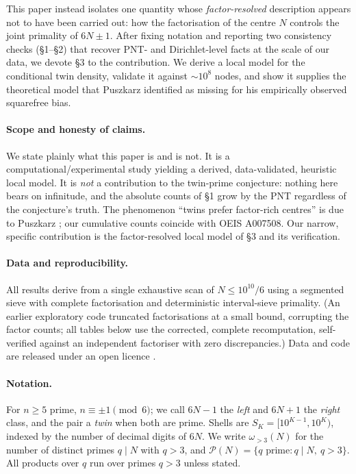 \documentclass[11pt]{article}
\theoremstyle{definition}
\theoremstyle{remark}
\begin{document}
This paper instead isolates one quantity whose \emph{factor-resolved} description
appears not to have been carried out: how the factorisation of the centre $N$
controls the joint primality of $6N\pm1$. After fixing notation and reporting two
consistency checks (\S1--\S2) that recover PNT- and Dirichlet-level facts at the
scale of our data, we devote \S3 to the contribution. We derive a local model for
the conditional twin density, validate it against $\sim\!10^8$ nodes, and show it
supplies the theoretical model that Puszkarz \cite{Puszkarz} identified as missing
for his empirically observed squarefree bias.

\paragraph{Scope and honesty of claims.}
We state plainly what this paper is and is not. It is a computational/experimental
study yielding a derived, data-validated, heuristic local model. It is
\emph{not} a contribution to the twin-prime conjecture: nothing here bears on
infinitude, and the absolute counts of \S1 grow by the PNT regardless of the
conjecture's truth. The phenomenon ``twins prefer factor-rich centres'' is due to
Puszkarz \cite{Puszkarz}; our cumulative counts coincide with OEIS A007508. Our
narrow, specific contribution is the factor-resolved local model of \S3 and its
verification.

\paragraph{Data and reproducibility.}
All results derive from a single exhaustive scan of $N\le 10^{10}/6$ using a
segmented sieve with complete factorisation and deterministic interval-sieve
primality. (An earlier exploratory code truncated factorisations at a small bound,
corrupting the factor counts; all tables below use the corrected, complete
recomputation, self-verified against an independent factoriser with zero
discrepancies.) Data and code are released under an open licence
\cite{repo}.

\paragraph{Notation.}
For $n\ge5$ prime, $n\equiv\pm1\pmod6$; we call $6N-1$ the \emph{left} and $6N+1$
the \emph{right} class, and the pair a \emph{twin} when both are prime. Shells are
$S_K=[10^{K-1},10^K)$, indexed by the number of decimal digits of $6N$. We write
$\omega_{>3}(N)$ for the number of distinct primes $q\mid N$ with $q>3$, and
$\mathcal P(N)=\{q\text{ prime}:q\mid N,\ q>3\}$. All products over $q$ run over
primes $q>3$ unless stated.
\end{document}
